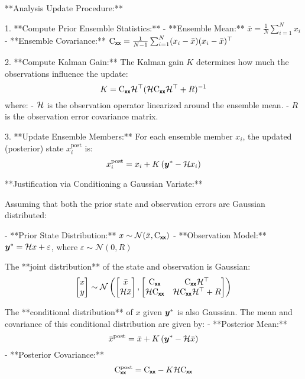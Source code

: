 \documentclass{article}
\begin{document}
**Analysis Update Procedure:**

1. **Compute Prior Ensemble Statistics:**
   - **Ensemble Mean:** \( \bar{x} = \frac{1}{N} \sum_{i=1}^{N} x_i \)
   - **Ensemble Covariance:** \( \mathrm{C}_{\boldsymbol{\mathsf{xx}}} = \frac{1}{N-1} \sum_{i=1}^{N} (x_i - \bar{x})(x_i - \bar{x})^\top \)

2. **Compute Kalman Gain:**
   The Kalman gain \( K \) determines how much the observations influence the update:
   \[
   K = \mathrm{C}_{\boldsymbol{\mathsf{xx}}} \mathcal{H}^\top (\mathcal{H} \mathrm{C}_{\boldsymbol{\mathsf{xx}}} \mathcal{H}^\top + R)^{-1}
   \]
   where:
   - \( \mathcal{H} \) is the observation operator linearized around the ensemble mean.
   - \( R \) is the observation error covariance matrix.

3. **Update Ensemble Members:**
   For each ensemble member \( x_i \), the updated (posterior) state \( x_i^\text{post} \) is:
   \[
   x_i^\text{post} = x_i + K \left(\boldsymbol{y}^*- \mathcal{H} x_i \right)
   \]

**Justification via Conditioning a Gaussian Variate:**

Assuming that both the prior state and observation errors are Gaussian distributed:

- **Prior State Distribution:** \( x \sim \mathcal{N}(\bar{x},  \mathrm{C}_{\boldsymbol{\mathsf{xx}}} ) \)
- **Observation Model:** \(\boldsymbol{y}^*= \mathcal{H} x + \varepsilon \), where \( \varepsilon \sim \mathcal{N}(0, R) \)

The **joint distribution** of the state and observation is Gaussian:
\[
\begin{bmatrix}
x \\
y
\end{bmatrix}
\sim \mathcal{N}\left(
\begin{bmatrix}
\bar{x} \\
\mathcal{H} \bar{x}
\end{bmatrix},
\begin{bmatrix}
 \mathrm{C}_{\boldsymbol{\mathsf{xx}}}  & \mathrm{C}_{\boldsymbol{\mathsf{xx}}} \mathcal{H}^\top \\
\mathcal{H} \mathrm{C}_{\boldsymbol{\mathsf{xx}}} & \mathcal{H} \mathrm{C}_{\boldsymbol{\mathsf{xx}}} \mathcal{H}^\top + R
\end{bmatrix}
\right)
\]

The **conditional distribution** of \( x \) given \(\boldsymbol{y}^*\) is also Gaussian. The mean and covariance of this conditional distribution are given by:
- **Posterior Mean:**
  \[
  \bar{x}^\text{post} = \bar{x} + K \left(\boldsymbol{y}^*- \mathcal{H} \bar{x} \right)
  \]
- **Posterior Covariance:**
  \[
   \mathrm{C}_{\boldsymbol{\mathsf{xx}}} ^\text{post} = \mathrm{C}_{\boldsymbol{\mathsf{xx}}} - K \mathcal{H}  \mathrm{C}_{\boldsymbol{\mathsf{xx}}}
  \]
\end{document}
